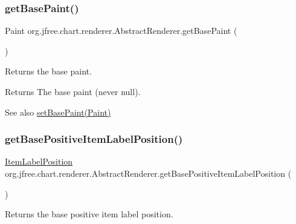 \subsubsection{\texorpdfstring{get\+Base\+Paint()}{getBasePaint()}}
{\footnotesize\ttfamily Paint org.\+jfree.\+chart.\+renderer.\+Abstract\+Renderer.\+get\+Base\+Paint (\begin{DoxyParamCaption}{ }\end{DoxyParamCaption})}

Returns the base paint.

\begin{DoxyReturn}{Returns}
The base paint (never {\ttfamily null}).
\end{DoxyReturn}
\begin{DoxySeeAlso}{See also}
\mbox{\hyperlink{classorg_1_1jfree_1_1chart_1_1renderer_1_1_abstract_renderer_aa52fbb777d55d74a89d024d2a46dc794}{set\+Base\+Paint(\+Paint)}} 
\end{DoxySeeAlso}
\mbox{\label{classorg_1_1jfree_1_1chart_1_1renderer_1_1_abstract_renderer_ab6f209ffdfae7e859ba7c047f3160630}} 
\subsubsection{\texorpdfstring{get\+Base\+Positive\+Item\+Label\+Position()}{getBasePositiveItemLabelPosition()}}
{\footnotesize\ttfamily \mbox{\hyperlink{classorg_1_1jfree_1_1chart_1_1labels_1_1_item_label_position}{Item\+Label\+Position}} org.\+jfree.\+chart.\+renderer.\+Abstract\+Renderer.\+get\+Base\+Positive\+Item\+Label\+Position (\begin{DoxyParamCaption}{ }\end{DoxyParamCaption})}

Returns the base positive item label position.

